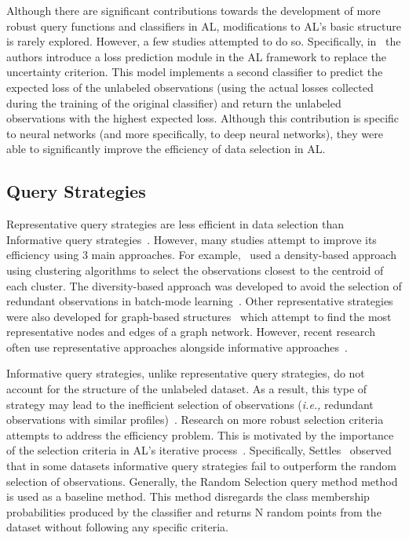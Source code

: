 \documentclass[parskip=full]{scrartcl}
\begin{document}
Although there are significant contributions towards the development of more
robust query functions and classifiers in AL, modifications to AL's basic
structure is rarely explored. However, a few studies attempted to do so.
Specifically, in~\cite{Yoo2019} the authors introduce a loss prediction module
in the AL framework to replace the uncertainty criterion. This model
implements a second classifier to predict the expected loss of the unlabeled
observations (using the actual losses collected during the training of the
original classifier) and return the unlabeled observations with the highest
expected loss. Although this contribution is specific to neural networks (and
more specifically, to deep neural networks), they were able to significantly
improve the efficiency of data selection in AL\@.

\subsection{Query Strategies}

Representative query strategies are less efficient in data selection than
Informative query strategies~\cite{Kumar2020}. However, many studies attempt
to improve its efficiency using 3 main approaches. For
example,~\cite{Huang2014, Li2012, Ienco2013} used a density-based approach
using clustering algorithms to select the observations closest to the centroid
of each cluster. The diversity-based approach was developed to avoid the
selection of redundant observations in batch-mode learning~\cite{Brinker2003}.
Other representative strategies were also developed for graph-based
structures~\cite{Jia2019} which attempt to find the most representative nodes
and edges of a graph network. However, recent research often use
representative approaches alongside informative approaches~\cite{Gu2021,
Samat2016}. 

Informative query strategies, unlike representative query strategies, do not
account for the structure of the unlabeled dataset. As a result, this type of
strategy may lead to the inefficient selection of observations (\textit{i.e.,}
redundant observations with similar profiles)~\cite{Kumar2020}. Research on
more robust selection criteria attempts to address the efficiency problem.
This is motivated by the importance of the selection criteria in AL's
iterative process~\cite{Rosario2020}. Specifically, Settles~\cite{Settles2011}
observed that in some datasets informative query strategies fail to outperform
the random selection of observations. Generally, the Random Selection query
method method is used as a baseline method. This method disregards the class
membership probabilities produced by the classifier and returns N random
points from the dataset without following any specific criteria.
\end{document}
